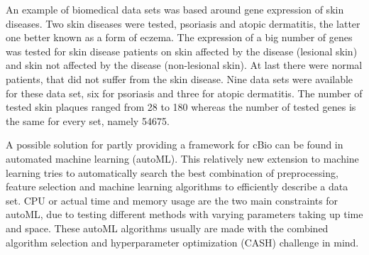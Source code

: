 \documentclass[10pt,a4paper]{article}
\begin{document}
	An example of biomedical data sets was based around gene expression of skin diseases. Two skin diseases were tested, psoriasis and atopic dermatitis, the latter one better known as a form of eczema. The expression of a big number of genes was tested for skin disease patients on skin affected by the disease (lesional skin) and skin not affected by the disease (non-lesional skin). At last there were normal patients, that did not suffer from the skin disease. Nine data sets were available for these data set, six for psoriasis and three for atopic dermatitis. The number of tested skin plaques ranged from 28 to 180 whereas the number of tested genes is the same for every set, namely 54675.
	
	
	A possible solution for partly providing a framework for cBio can be found in automated machine learning (autoML). This relatively new extension to machine learning tries to automatically search the best combination of preprocessing, feature selection and machine learning algorithms to efficiently describe a data set. CPU or actual time and memory usage are the two main constraints for autoML, due to testing different methods with varying parameters taking up time and space. These autoML algorithms usually are made with the combined algorithm selection and hyperparameter optimization (CASH) challenge in mind.\cite{feurer2015efficient} 
	
\end{document}
